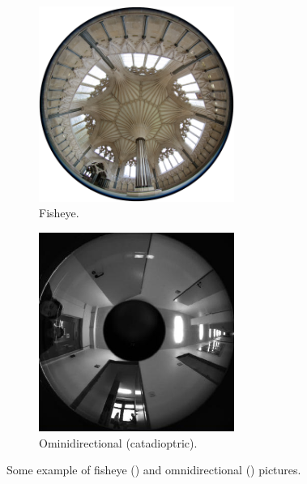 \begin{figure}
	\centering
	\begin{subfigure}{0.4\textwidth}
		\centering
		\includegraphics[width=0.7\textwidth]{img/fisheye_example}
		\caption{Fisheye.}\label{fig:fisheye_example}
	\end{subfigure}
	\begin{subfigure}{0.4\textwidth}
		\centering
		\includegraphics[width=0.7\textwidth]{img/omnidirectional_example}
		\caption{Ominidirectional (catadioptric).}\label{fig:omnidirectional_example}
	\end{subfigure}
	\caption{Some example of fisheye () and omnidirectional () pictures.}\label{fig:wide_fov_pics}
\end{figure}


